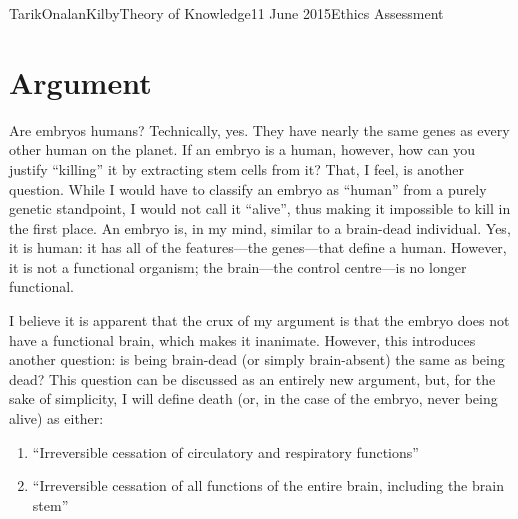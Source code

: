 \documentclass[a4paper,12pt]{article}
\begin{document}
    \begin{mla}{Tarik}{Onalan}{Kilby}{Theory of Knowledge}{11 June 2015}{Ethics Assessment}
        \section{Argument}
            Are embryos humans? Technically, yes. They have nearly the same genes as every other
            human on the planet. If an embryo is a human, however, how can you justify ``killing''
            it by extracting stem cells from it? That, I feel, is another question. While I would
            have to classify an embryo as ``human'' from a purely genetic standpoint, I would
            not call it ``alive'', thus making it impossible to kill in the first place. An embryo
            is, in my mind, similar to a brain-dead individual. Yes, it is human: it has all
            of the features---the genes---that define a human. However, it is not a functional
            organism; the brain---the control centre---is no longer functional.

            I believe it is apparent that the crux of my argument is that the embryo does not have
            a functional brain, which makes it inanimate. However, this introduces another question:
            is being brain-dead (or simply brain-absent) the same as being dead? This question
            can be discussed as an entirely new argument, but, for the sake of simplicity, I will
            define death (or, in the case of the embryo, never being alive) as either:
            \begin{enumerate}
                \item ``Irreversible cessation of circulatory and respiratory functions''
                \item ``Irreversible cessation of all functions of the entire brain, including the
                    brain stem''
            \end{enumerate}
            \cite{death}
            

\end{mla}
\end{document}
